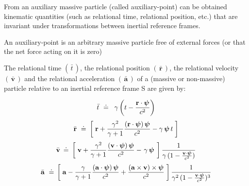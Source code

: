 \documentclass[10pt,fleqn]{article}
\begin{document}
\noindent From an auxiliary massive particle (called auxiliary-point) can be obtained kinematic quantities (such as relational time, relational position, etc.) that are invariant under transformations between inertial reference frames.
\par \bigskip \smallskip
\noindent An auxiliary-point is an arbitrary massive particle free of external forces (or that the net force acting on it is zero)
\par \bigskip \smallskip
\noindent The relational time $( \, \bar{t} \, )$, the relational position $( \, \bar{\mathbf{r}} \, )$, the relational velocity $( \, \bar{\mathbf{v}} \, )$ and the relational acceleration $( \, \bar{\mathbf{a}} \, )$ of a (massive or non-massive) particle \hbox {relative} to an inertial reference frame S are given by:
\par \vspace{+0.21em}
\begin{eqnarray*}
\bar{t} ~\doteq~ \hspace{+0.24em} \gamma \left ( t - \frac{\mathbf{r} \cdot \boldsymbol{\psi}}{c^2} \right )
\end{eqnarray*}
\vspace{-0.45em}
\begin{eqnarray*}
\bar{\mathbf{r}} ~\doteq~ \hspace{-0.09em} \left [ \; \mathbf{r} + \frac{\gamma^2}{\gamma + 1} \frac{( \mathbf{r} \cdot \boldsymbol{\psi} ) \, \boldsymbol{\psi}}{c^2} - \gamma \, \boldsymbol{\psi} \, t \; \right ]
\end{eqnarray*}
\vspace{-0.30em}
\begin{eqnarray*}
\bar{\mathbf{v}} \hspace{-0.12em} ~\doteq~ \hspace{-0.12em} \left [ \; \mathbf{v} + \frac{\gamma^2}{\gamma + 1} \frac{( \mathbf{v} \cdot \boldsymbol{\psi} ) \, \boldsymbol{\psi}}{c^2} - \hspace{+0.114em} \gamma \, \boldsymbol{\psi} \hspace{+0.114em} \; \right ] \frac{1}{\gamma \, ( 1 - \frac{\mathbf{v} \cdot \boldsymbol{\psi}}{c^2} )}
\end{eqnarray*}
\vspace{-0.30em}
\begin{eqnarray*}
\bar{\mathbf{a}} ~\doteq~ \hspace{-0.18em} \left [ \; \mathbf{a} - \frac{\gamma}{\gamma + 1} \frac{( \mathbf{a} \cdot \boldsymbol{\psi} ) \, \boldsymbol{\psi}}{c^2} + \frac{( \mathbf{a} \times \mathbf{v} ) \times \boldsymbol{\psi}}{c^2} \; \right ] \frac{1}{\gamma^2 \, ( 1 - \frac{\mathbf{v} \cdot \boldsymbol{\psi}}{c^2} )^3}
\end{eqnarray*}
\end{document}
